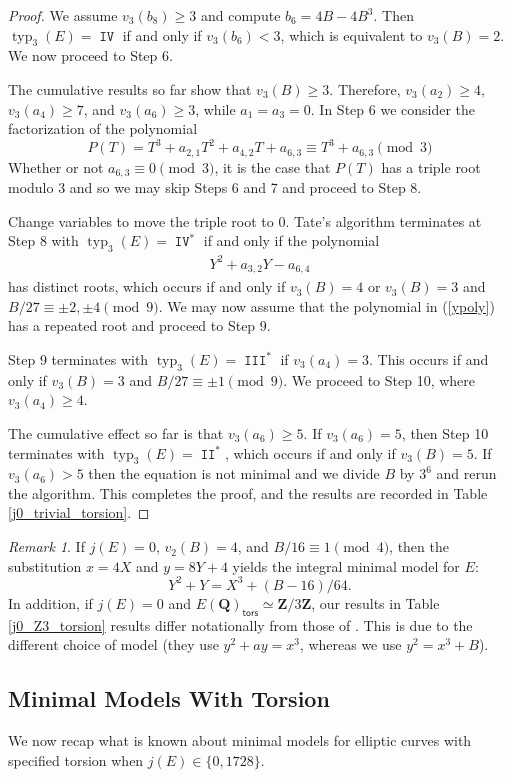 \documentclass{amsart}
\newcommand{\Z}{\mathbf{Z}}
\newcommand{\Q}{\mathbf{Q}}
\newcommand{\tors}{\mathsf{tors}}
\DeclareMathOperator{\typ}{{typ}}
\DeclareMathOperator{\II}{\mathtt{II}}
\DeclareMathOperator{\III}{\mathtt{III}}
\DeclareMathOperator{\IV}{\mathtt{IV}}
\numberwithin{equation}{section}
\theoremstyle{plain}
\theoremstyle{remark}
\newtheorem{rmk}[equation]{Remark}
\begin{document}
\begin{proof}
We assume $v_3(b_8) \geq 3$ and compute $b_6 = 4B-4B^3$.  Then $\typ_3(E) = \IV$ if and only if $v_3(b_6)<3$, which is equivalent to $v_3(B) = 2$.  We now proceed to Step 6.

The cumulative results so far show that $v_3(B) \geq 3$. Therefore, $v_3(a_2) \geq 4$, $v_3(a_4) \geq 7$, and $v_3(a_6)\geq 3$, while $a_1=a_3=0$.   In Step 6 we consider the factorization of the polynomial
\[
P(T) = T^3 + a_{2,1}T^2+a_{4,2}T+a_{6,3} \equiv T^3 + a_{6,3} \pmod{3}
\]
Whether or not $a_{6,3} \equiv 0 \pmod{3}$, it is the case that $P(T)$ has a triple root modulo 3 and so we may skip Steps 6 and 7 and proceed to Step 8. 

Change variables  to move the triple root to 0.  Tate's algorithm terminates at Step 8 with $\typ_3(E) = \IV^*$ if and only if the polynomial
\begin{align} \label{ypoly}
Y^2 + a_{3,2}Y - a_{6,4}
\end{align}
has distinct roots, which occurs if and only if $v_3(B)=4$ or $v_3(B)=3$ and $B/27 \equiv \pm2,\pm4 \pmod{9}$.  We may now assume that the polynomial in (\ref{ypoly}) has a repeated root and proceed to Step 9.

Step 9 terminates with $\typ_3(E) = \III^*$ if $v_3(a_4) = 3$.  This occurs if and only if $v_3(B) = 3$ and $B/27 \equiv \pm  1 \pmod{9}$.  We proceed to Step 10, where $v_3(a_4) \geq 4$.

The cumulative effect so far is that $v_3(a_6) \geq 5$.  If $v_3(a_6) = 5$, then Step 10 terminates with $\typ_3(E) = \II^*$, which occurs if and only if $v_3(B) =5$.  If $v_3(a_6)>5$ then the equation is not minimal and we divide $B$ by $3^6$ and rerun the algorithm.  This completes the proof, and the results  are recorded in Table \ref{j0_trivial_torsion}. 
\end{proof}

\begin{rmk}
If $j(E) = 0$, $v_2(B) = 4$, and $B/16 \equiv 1 \pmod{4}$, then the substitution $x = 4X$ and $y = 8Y + 4$ yields the integral minimal model for $E$: 
\[
Y^2 + Y = X^3 + (B-16)/64.
\]
In addition, if $j(E) = 0$ and $E(\Q)_{\tors} \simeq \Z/3\Z$, our results in Table \ref{j0_Z3_torsion} results differ notationally from those of \cite[Table 10]{br}.  This is due to the different choice of model (they use $y^2  + ay = x^3$, whereas we use $y^2 = x^3 +B$). 
\end{rmk}

\subsection{Minimal Models With Torsion} We now  recap what is known about minimal models for elliptic curves with specified torsion when $j(E) \in \lbrace 0,1728 \rbrace$.
\end{document}
